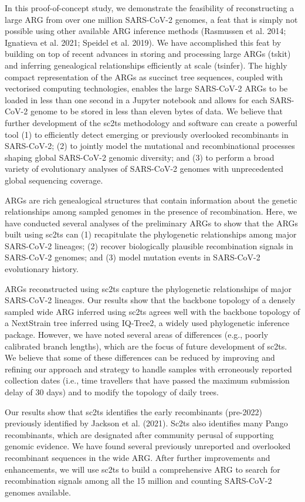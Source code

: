 \documentclass{article}
\begin{document}
In this proof-of-concept study, we demonstrate the feasibility of reconstructing a large ARG from over one million SARS-CoV-2 genomes, a feat that is simply not possible using other available ARG inference methods (Rasmussen et al. 2014; Ignatieva et al. 2021; Speidel et al. 2019). We have accomplished this feat by building on top of recent advances in storing and processing large ARGs (tskit) and inferring genealogical relationships efficiently at scale (tsinfer). The highly compact representation of the ARGs as succinct tree sequences, coupled with vectorised computing technologies, enables the large SARS-CoV-2 ARGs to be loaded in less than one second in a Jupyter notebook and allows for each SARS-CoV-2 genome to be stored in less than eleven bytes of data. We believe that further development of the sc2ts methodology and software can create a powerful tool (1) to efficiently detect emerging or previously overlooked recombinants in SARS-CoV-2; (2) to jointly model the mutational and recombinational processes shaping global SARS-CoV-2 genomic diversity; and (3) to perform a broad variety of evolutionary analyses of SARS-CoV-2 genomes with unprecedented global sequencing coverage.

ARGs are rich genealogical structures that contain information about the genetic relationships among sampled genomes in the presence of recombination. Here, we have conducted several analyses of the preliminary ARGs to show that the ARGs built using sc2ts can (1) recapitulate the phylogenetic relationships among major SARS-CoV-2 lineages; (2) recover biologically plausible recombination signals in SARS-CoV-2 genomes; and (3) model mutation events in SARS-CoV-2 evolutionary history.

ARGs reconstructed using sc2ts capture the phylogenetic relationships of major SARS-CoV-2 lineages. Our results show that the backbone topology of a densely sampled wide ARG inferred using sc2ts agrees well with the backbone topology of a NextStrain tree inferred using IQ-Tree2, a widely used phylogenetic inference package. However, we have noted several areas of differences (e.g., poorly calibrated branch lengths), which are the focus of future development of sc2ts. We believe that some of these differences can be reduced by improving and refining our approach and strategy to handle samples with erroneously reported collection dates (i.e., time travellers that have passed the maximum submission delay of 30 days) and to modify the topology of daily trees.

Our results show that sc2ts identifies the early recombinants (pre-2022) previously identified by Jackson et al. (2021). Sc2ts also identifies many Pango recombinants, which are designated after community perusal of supporting genomic evidence. We have found several previously unreported and overlooked recombinant sequences in the wide ARG. After further improvements and enhancements, we will use sc2ts to build a comprehensive ARG to search for recombination signals among all the 15 million and counting SARS-CoV-2 genomes available.
\end{document}
